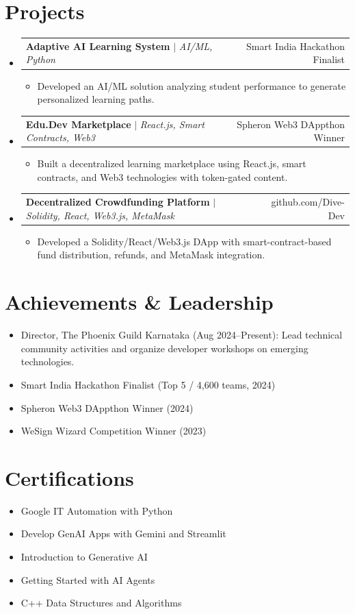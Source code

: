 \documentclass[a4paper,9pt]{article}
\makeatletter
\newcommand{\resumeItem}[1]{
  \item\small{
    {#1 \vspace{-1pt}}
  }
}
\newcommand{\resumeProjectHeading}[2]{
    \vspace{-1pt}\item
    \begin{tabular*}{0.98\textwidth}{l@{\extracolsep{\fill}}r}
      \small#1 & #2 \\
    \end{tabular*}\vspace{-5pt}
}
\newcommand{\resumeSubHeadingListStart}{\begin{itemize}[leftmargin=0.15in, label={}]}
\newcommand{\resumeSubHeadingListEnd}{\end{itemize}}
\newcommand{\resumeItemListStart}{\begin{itemize}[leftmargin=0.15in]}
\newcommand{\resumeItemListEnd}{\end{itemize}\vspace{-3pt}}
\makeatother
\begin{document}
\section{Projects}
  \resumeSubHeadingListStart
    \resumeProjectHeading
      {\textbf{Adaptive AI Learning System} $|$ \emph{AI/ML, Python}}{Smart India Hackathon Finalist}
    \resumeItemListStart
      \resumeItem{Developed an AI/ML solution analyzing student performance to generate personalized learning paths.}
    \resumeItemListEnd
    \resumeProjectHeading
      {\textbf{Edu.Dev Marketplace} $|$ \emph{React.js, Smart Contracts, Web3}}{Spheron Web3 DAppthon Winner}
    \resumeItemListStart
      \resumeItem{Built a decentralized learning marketplace using React.js, smart contracts, and Web3 technologies with token-gated content.}
    \resumeItemListEnd
    \resumeProjectHeading
      {\textbf{Decentralized Crowdfunding Platform} $|$ \emph{Solidity, React, Web3.js, MetaMask}}{github.com/Dive-Dev}
    \resumeItemListStart
      \resumeItem{Developed a Solidity/React/Web3.js DApp with smart-contract-based fund distribution, refunds, and MetaMask integration.}
    \resumeItemListEnd
  \resumeSubHeadingListEnd

\section{Achievements \& Leadership}
  \resumeItemListStart
    \resumeItem{Director, The Phoenix Guild Karnataka (Aug 2024--Present): Lead technical community activities and organize developer workshops on emerging technologies.}
    \resumeItem{Smart India Hackathon Finalist (Top 5 / 4,600 teams, 2024)}
    \resumeItem{Spheron Web3 DAppthon Winner (2024)}
    \resumeItem{WeSign Wizard Competition Winner (2023)}
  \resumeItemListEnd


\section{Certifications}
  \resumeItemListStart
    \resumeItem{Google IT Automation with Python}
    \resumeItem{Develop GenAI Apps with Gemini and Streamlit}
    \resumeItem{Introduction to Generative AI}
    \resumeItem{Getting Started with AI Agents}
    \resumeItem{C++ Data Structures and Algorithms}
  \resumeItemListEnd
\end{document}
